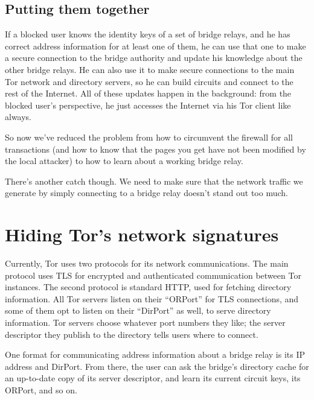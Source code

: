 \documentclass{llncs}
\begin{document}
\subsection{Putting them together}
\label{subsec:relay-together}

If a blocked user knows the identity keys of a set of bridge relays, and
he has correct address information for at least one of them, he can use
that one to make a secure connection to the bridge authority and update
his knowledge about the other bridge relays. He can also use it to make
secure connections to the main Tor network and directory servers, so he
can build circuits and connect to the rest of the Internet. All of these
updates happen in the background: from the blocked user's perspective,
he just accesses the Internet via his Tor client like always.

So now we've reduced the problem from how to circumvent the firewall
for all transactions (and how to know that the pages you get have not
been modified by the local attacker) to how to learn about a working
bridge relay.

There's another catch though. We need to make sure that the network
traffic we generate by simply connecting to a bridge relay doesn't stand
out too much.



\section{Hiding Tor's network signatures}
\label{sec:network-signature}
\label{subsec:enclave-dirs}

Currently, Tor uses two protocols for its network communications. The
main protocol uses TLS for encrypted and authenticated communication
between Tor instances. The second protocol is standard HTTP, used for
fetching directory information. All Tor servers listen on their ``ORPort''
for TLS connections, and some of them opt to listen on their ``DirPort''
as well, to serve directory information. Tor servers choose whatever port
numbers they like; the server descriptor they publish to the directory
tells users where to connect.

One format for communicating address information about a bridge relay is
its IP address and DirPort. From there, the user can ask the bridge's
directory cache for an up-to-date copy of its server descriptor, and
learn its current circuit keys, its ORPort, and so on.
\end{document}
